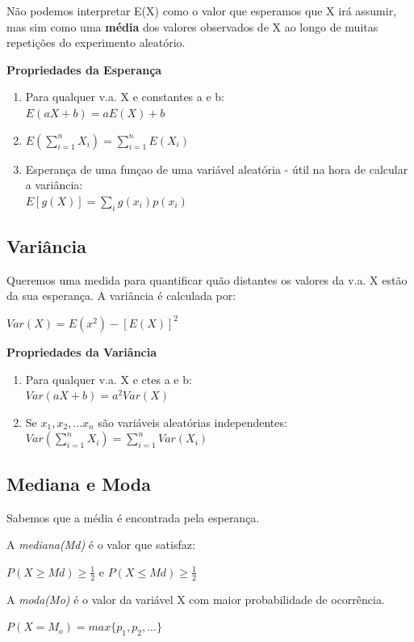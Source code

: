 \documentclass[a4paper, 12pt]{article}
\begin{document}
	Não podemos interpretar E(X) como o valor que esperamos que X irá assumir, mas sim como uma \textbf{média} dos valores observados de X ao longo de muitas repetições do experimento aleatório.
	
	\textbf{Propriedades da Esperança}
	\begin{enumerate}
		\item Para qualquer v.a. X e constantes a e b: \\ $E(aX + b) = aE(X) + b$
		\item $E(\sum_{i=1}^{n} X_{i}) = \sum_{i=1}^{n}E(X_{i})$
		\item Esperança de uma funçao de uma variável aleatória - útil na hora de calcular a variância:\\
		$E[g(X)] = \sum_{i}g(x_{i})p(x_{i})$
	\end{enumerate}
\subsection{Variância}
	Queremos uma medida para quantificar quão distantes os valores da v.a. X estão da sua esperança. A variância é calculada por:
	\begin{center}
		\LARGE
		$Var(X) = E(x^{2}) - [E(X)]^{2}$
	\end{center}
	
	\textbf{Propriedades da Variância}
	\begin{enumerate}
		\item Para qualquer v.a. X e ctes a e b:\\$Var(aX + b) = a^{2}Var(X)$
		\item Se $x_{1}, x_{2}, ... x_{n}$ são variáveis aleatórias independentes:\\
		$Var(\sum_{i=1}^{n}X_{i}) = \sum_{i=1}^{n}Var(X_{i})$
	\end{enumerate}

\subsection{Mediana e Moda}
	Sabemos que a média é encontrada pela esperança.
	
	A \textit{mediana(Md)} é o valor que satisfaz:
	\begin{center}
		\LARGE
		$P(X\geq Md) \geq \frac{1}{2}$ e $P(X\leq Md) \geq \frac{1}{2}$
	\end{center}

	A \textit{moda(Mo)} é o valor da variável X com maior probabilidade de ocorrência.
	\begin{center}
		\LARGE
		$P(X = M_{o}) = max\{p_{1}, p_{2}, ...\}$
	\end{center}
\end{document}

